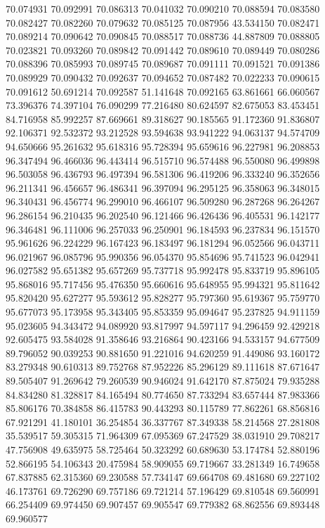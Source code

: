 70.074931
70.092991
70.086313
70.041032
70.090210
70.088594
70.083580
70.082427
70.082260
70.079632
70.085125
70.087956
43.534150
70.082471
70.089214
70.090642
70.090845
70.088517
70.088736
44.887809
70.088805
70.023821
70.093260
70.089842
70.091442
70.089610
70.089449
70.080286
70.088396
70.085993
70.089745
70.089687
70.091111
70.091521
70.091386
70.089929
70.090432
70.092637
70.094652
70.087482
70.022233
70.090615
70.091612
50.691214
70.092587
51.141648
70.092165
63.861661
66.060567
73.396376
74.397104
76.090299
77.216480
80.624597
82.675053
83.453451
84.716958
85.992257
87.669661
89.318627
90.185565
91.172360
91.836807
92.106371
92.532372
93.212528
93.594638
93.941222
94.063137
94.574709
94.650666
95.261632
95.618316
95.728394
95.659616
96.227981
96.208853
96.347494
96.466036
96.443414
96.515710
96.574488
96.550080
96.499898
96.503058
96.436793
96.497394
96.581306
96.419206
96.333240
96.352656
96.211341
96.456657
96.486341
96.397094
96.295125
96.358063
96.348015
96.340431
96.456774
96.299010
96.466107
96.509280
96.287268
96.264267
96.286154
96.210435
96.202540
96.121466
96.426436
96.405531
96.142177
96.346481
96.111006
96.257033
96.250901
96.184593
96.237834
96.151570
95.961626
96.224229
96.167423
96.183497
96.181294
96.052566
96.043711
96.021967
96.085796
95.990356
96.054370
95.854696
95.741523
96.042941
96.027582
95.651382
95.657269
95.737718
95.992478
95.833719
95.896105
95.868016
95.717456
95.476350
95.660616
95.648955
95.994321
95.811642
95.820420
95.627277
95.593612
95.828277
95.797360
95.619367
95.759770
95.677073
95.173958
95.343405
95.853359
95.094647
95.237825
94.911159
95.023605
94.343472
94.089920
93.817997
94.597117
94.296459
92.429218
92.605475
93.584028
91.358646
93.216864
90.423166
94.533157
94.677509
89.796052
90.039253
90.881650
91.221016
94.620259
91.449086
93.160172
83.279348
90.610313
89.752768
87.952226
85.296129
89.111618
87.671647
89.505407
91.269642
79.260539
90.946024
91.642170
87.875024
79.935288
84.834280
81.328817
84.165494
80.774650
87.733294
83.657444
87.983366
85.806176
70.384858
86.415783
90.443293
80.115789
77.862261
68.856816
67.921291
41.180101
36.254854
36.337767
87.349338
58.214568
27.281808
35.539517
59.305315
71.964309
67.095369
67.247529
38.031910
29.708217
47.756908
49.635975
58.725464
50.323292
60.689630
53.174784
52.880196
52.866195
54.106343
20.475984
58.909055
69.719667
33.281349
16.749658
67.837885
62.315360
69.230588
57.734147
69.664708
69.481680
69.227102
46.173761
69.726290
69.757186
69.721214
57.196429
69.810548
69.560991
66.254409
69.974450
69.907457
69.905547
69.779382
68.862556
69.893448
69.960577
